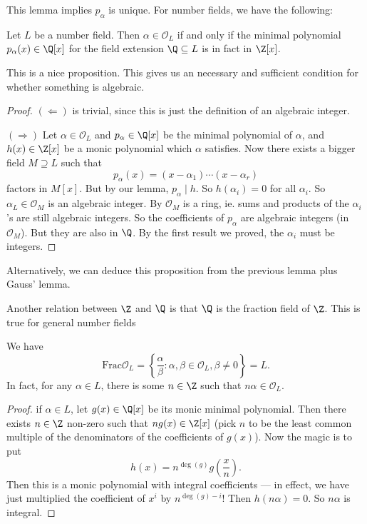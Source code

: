 \documentclass[a4paper]{article}
\begin{document}
This lemma implies $p_\alpha$ is unique. For number fields, we have the following:
\begin{prop}
  Let $L$ be a number field. Then $\alpha \in \mathcal{O}_L$ if and only if the minimal polynomial $p_\alpha(x) \in \Q[x]$ for the field extension $\Q \subseteq L$ is in fact in $\Z[x]$.
\end{prop}
This is a nice proposition. This gives us an necessary and sufficient condition for whether something is algebraic.
\begin{proof}
  $(\Leftarrow)$ is trivial, since this is just the definition of an algebraic integer.

  $(\Rightarrow)$ Let $\alpha \in \mathcal{O}_L$ and $p_\alpha \in \Q[x]$ be the minimal polynomial of $\alpha$, and $h(x) \in \Z[x]$ be a monic polynomial which $\alpha$ satisfies. Now there exists a bigger field $M \supseteq L$ such that
  \[
    p_\alpha(x) = (x - \alpha_1) \cdots (x - \alpha_r)
  \]
  factors in $M[x]$. But by our lemma, $p_\alpha \mid h$. So $h(\alpha_i) = 0$ for all $\alpha_i$. So $\alpha_L \in \mathcal{O}_M$ is an algebraic integer. By $\mathcal{O}_M$ is a ring, ie. sums and products of the $\alpha_i$'s are still algebraic integers. So the coefficients of $p_\alpha$ are algebraic integers (in $\mathcal{O}_M$). But they are also in $\Q$. By the first result we proved, the $\alpha_i$ must be integers.
\end{proof}
Alternatively, we can deduce this proposition from the previous lemma plus Gauss' lemma.

Another relation between $\Z$ and $\Q$ is that $\Q$ is the fraction field of $\Z$. This is true for general number fields
\begin{lemma}
  We have
  \[
    \mathrm{Frac} \mathcal{O}_L = \left\{\frac{\alpha}{\beta}: \alpha, \beta \in \mathcal{O}_L, \beta \not= 0\right\} = L.
  \]
  In fact, for any $\alpha \in L$, there is some $n \in \Z$ such that $n\alpha \in \mathcal{O}_L$.
\end{lemma}

\begin{proof}
  if $\alpha \in L$, let $g(x) \in \Q[x]$ be its monic minimal polynomial. Then there exists $n \in \Z$ non-zero such that $ng(x) \in \Z[x]$ (pick $n$ to be the least common multiple of the denominators of the coefficients of $g(x)$). Now the magic is to put
  \[
    h(x) = n^{\deg(g)}g\left(\frac{x}{n}\right).
  \]
  Then this is a monic polynomial with integral coefficients --- in effect, we have just multiplied the coefficient of $x^i$ by $n^{\deg(g) - i}$! Then $h(n\alpha) = 0$. So $n\alpha$ is integral.
\end{proof}
\end{document}
